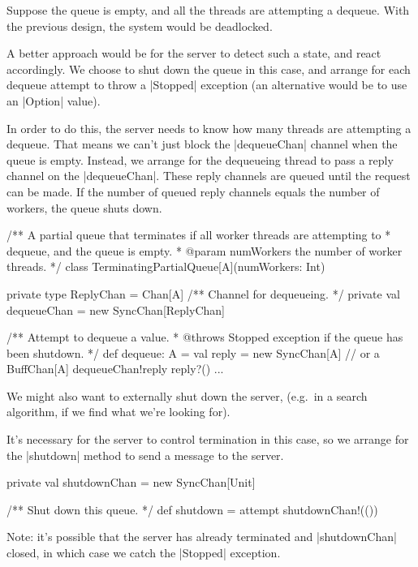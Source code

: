 
\begin{slide}

Suppose the queue is empty, and all the threads are attempting a dequeue.
With the previous design, the system would be deadlocked.

A better approach would be for the server to detect such a state, and react
accordingly.  We choose to shut down the queue in this case, and arrange for
each dequeue attempt to throw a |Stopped| exception (an alternative would be
to use an |Option| value).

In order to do this, the server needs to know how many threads are attempting
a dequeue.  That means we can't just block the |dequeueChan| channel when the
queue is empty.  Instead, we arrange for the dequeueing thread to pass a reply
channel on the |dequeueChan|.  These reply channels are queued until the
request can be made.  If the number of queued reply channels equals the number
of workers, the queue shuts down.
\end{slide}


\begin{slide}

\begin{scala}
/** A partial queue that terminates if all worker threads are attempting to
  * dequeue, and the queue is empty.
  * @param numWorkers the number of worker threads. */
class TerminatingPartialQueue[A](numWorkers: Int){
  private type ReplyChan = Chan[A]
  /** Channel for dequeueing. */
  private val dequeueChan = new SyncChan[ReplyChan]

  /** Attempt to dequeue a value.
    * @throws Stopped exception if the queue has been shutdown. */
  def dequeue: A = {
    val reply = new SyncChan[A] // or a BuffChan[A]
    dequeueChan!reply
    reply?()
  }
  ... 
}
\end{scala}
\end{slide}


\begin{slide}

We might also want to externally shut down the server, (e.g.~in a search
algorithm, if we find what we're looking for).

It's necessary for the server to control termination in this case, so we
arrange for the |shutdown| method to send a message to the server. 
%
\begin{scala}
  private val shutdownChan = new SyncChan[Unit]

  /** Shut down this queue. */
  def shutdown = attempt{ shutdownChan!(()) }{ }
\end{scala}
Note: it's possible that the server has already terminated and |shutdownChan|
closed, in which case we catch the |Stopped| exception.

\end{slide}
  
